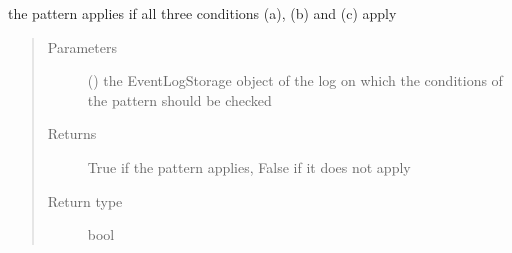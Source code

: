 \documentclass[letterpaper,10pt,english]{sphinxmanual}
\begin{document}
\begin{fulllineitems}
\begin{fulllineitems}
\label{\detokenize{event_log_analyzer:event_log_analyzer.pattern_library.manufacturing_scheduling_patterns.FlowShop.pattern_applies}}
\sphinxAtStartPar
the pattern applies if all three conditions (a), (b) and (c) apply
\begin{quote}\begin{description}
\item[{Parameters}] \leavevmode
\sphinxAtStartPar
{} ({\hyperref[\detokenize{event_log_analyzer:event_log_analyzer.event_log.EventLogStorage}]{}}) \textendash{} the EventLogStorage object of the log on which the conditions of the pattern should be checked

\item[{Returns}] \leavevmode
\sphinxAtStartPar
True if the pattern applies, False if it does not apply

\item[{Return type}] \leavevmode
\sphinxAtStartPar
bool

\end{description}\end{quote}

\end{fulllineitems}


\end{fulllineitems}

\end{document}
